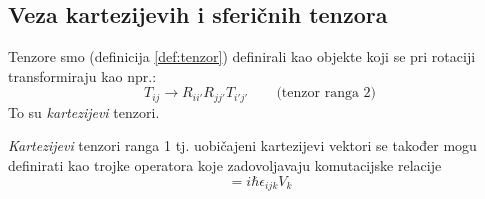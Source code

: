 
\subsection{Veza kartezijevih i sferičnih tenzora}
\label{sect:sfericniVSkartezijevi}

Tenzore smo (definicija \ref{def:tenzor}) definirali kao objekte koji se pri rotaciji
transformiraju kao npr.:
\begin{displaymath}
   T_{ij} \longrightarrow  R_{ii'}R_{jj'}T_{i'j'} \qquad \text{(tenzor ranga 2)}
\end{displaymath}
To su \emph{kartezijevi} tenzori.

\emph{Kartezijevi} tenzori ranga 1 tj. uobičajeni kartezijevi vektori
se također mogu definirati kao trojke operatora koje zadovoljavaju
komutacijske relacije
\begin{equation}
 [J_i, V_j] = i\hbar \epsilon_{ijk} V_k
\end{equation}

